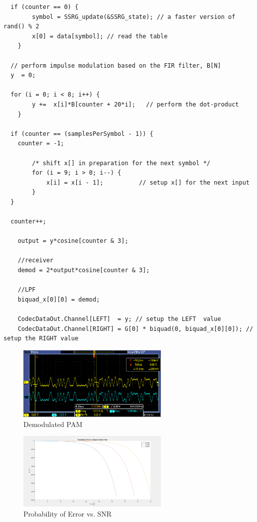 \documentclass{article}
\begin{document}
\begin{verbatim}
  if (counter == 0) {
		symbol = SSRG_update(&SSRG_state); // a faster version of rand() % 2
		x[0] = data[symbol]; // read the table
	}

  // perform impulse modulation based on the FIR filter, B[N] 
  y  = 0;

  for (i = 0; i < 8; i++) {
		y +=  x[i]*B[counter + 20*i];	// perform the dot-product
	}

  if (counter == (samplesPerSymbol - 1)) {
    counter = -1; 

		/* shift x[] in preparation for the next symbol */
 		for (i = 9; i > 0; i--) {
			x[i] = x[i - 1];          // setup x[] for the next input
		}
  }

  counter++;

	output = y*cosine[counter & 3];

	//receiver
	demod = 2*output*cosine[counter & 3];

	//LPF
	biquad_x[0][0] = demod;

	CodecDataOut.Channel[LEFT]  = y; // setup the LEFT  value
	CodecDataOut.Channel[RIGHT] = G[0] * biquad(0, biquad_x[0][0]); // setup the RIGHT value
\end{verbatim}

\begin{figure}[h]
  \begin{center}
    \includegraphics[width=0.65\textwidth]{img/tx_rx.png}
    \caption{Demodulated PAM}
  \end{center}
\end{figure}

\begin{figure}[h]
  \begin{center}
    \includegraphics[width=0.65\textwidth]{img/probability_of_error.png}
    \caption{Probability of Error vs. SNR}
  \end{center}
\end{figure}
\end{document}
